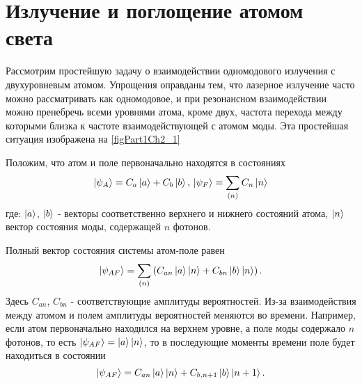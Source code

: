 \section{Излучение и поглощение атомом света}
Рассмотрим простейшую задачу о взаимодействии одномодового излучения с
двухуровневым атомом. Упрощения оправданы тем, что лазерное излучение
часто можно рассматривать как одномодовое, и при резонансном
взаимодействии можно пренебречь всеми уровнями атома, кроме двух,
частота перехода между которыми близка к частоте взаимодействующей с
атомом моды. Эта простейшая ситуация изображена на \autoref{figPart1Ch2_1}



Положим, что атом и поле первоначально находятся в состояниях
\begin{equation}
\left|\psi_A\right> = C_a\ket{a} + C_b\ket{b}, \,
\left|\psi_F\right> = \sum_{(n)}C_n\ket{n}
\end{equation}
где:  $\ket{a}$, $\ket{b}$ - векторы соответственно
верхнего и нижнего состояний атома, $\ket{n}$ вектор состояния
моды, содержащей  $n$  фотонов.
  
Полный вектор состояния системы атом-поле равен
\begin{equation}
\left|\psi_{AF}\right> = \sum_{(n)} 
\left(
C_{an}\ket{a}\ket{n} + 
C_{bn}\ket{b}\ket{n}
\right).
\end{equation}
Здесь $C_{an}$, $C_{bn}$ - соответствующие амплитуды
вероятностей. Из-за взаимодействия между атомом и полем
амплитуды вероятностей меняются во времени. Например, если
атом первоначально находился на верхнем уровне, а поле моды
содержало  $n$  фотонов, то есть  
$\left|\psi_{AF}\right> = \ket{a}\ket{n}$,
то в последующие моменты времени поле будет находиться в состоянии  
\begin{equation}
\left|\psi_{AF}\right> =
C_{an}\ket{a}\ket{n} + 
C_{b,n + 1}\ket{b}\ket{n + 1}.
\label{eq:part1:rabi_solution}
\end{equation}

